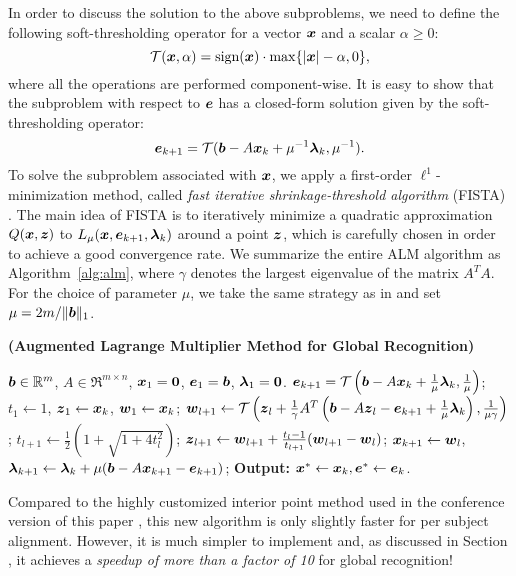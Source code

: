 In order to discuss the solution to the above subproblems, we
need to define the following soft-thresholding operator for a
vector ${\boldsymbol{x}}$ and a scalar $\alpha \geq 0$:
\begin{equation}
\mathcal{T}({\boldsymbol{x}},\alpha) = \textup{sign}({\boldsymbol{x}})\cdot \max \{|{\boldsymbol{x}}| - \alpha, 0\},
\end{equation}
where all the operations are performed component-wise. It is
easy to show that the subproblem with respect to $\boldsymbol{e}$ has a
closed-form solution given by the soft-thresholding operator:
\begin{equation}
\boldsymbol{e}_{k+1} = \mathcal{T}(\boldsymbol{b} - A{\boldsymbol{x}}_k + \mu^{-1}\boldsymbol{\lambda}_k, \mu^{-1}).
\end{equation}
To solve the subproblem associated with ${\boldsymbol{x}}$, we
apply a first-order $\ell^1$-minimization method,
called \emph{fast iterative shrinkage-threshold algorithm}
(FISTA) \cite{BeckA2009}. The main idea of FISTA is to
iteratively minimize a quadratic approximation $Q({\boldsymbol{x}}, \boldsymbol{z})$ to
$L_{\mu} ({\boldsymbol{x}},\boldsymbol{e}_{k+1},\boldsymbol{\lambda}_k)$ around a point $\boldsymbol{z}$, which is
carefully chosen in order to achieve a good convergence
rate. We summarize the entire ALM
algorithm as Algorithm~\ref{alg:alm}, where $\gamma$ denotes the
largest eigenvalue of the matrix $A^TA$. For the choice of parameter $\mu$, we take the same strategy as
in \cite{YangJ2009-pp} and set $\mu = 2m / \|\boldsymbol{b}\|_1$.
\begin{algorithm}[t]
\caption{\bf (Augmented Lagrange Multiplier Method for Global
Recognition)}
\begin{algorithmic}[1]
\begin{small}
 $\boldsymbol{b} \in \mathbb R^m$, $A \in \Re^{m \times n}$,
${\boldsymbol{x}}_1 = \boldsymbol{0}$, $\boldsymbol{e}_1 = \boldsymbol{b}$, $\boldsymbol{\lambda}_1 =
\boldsymbol{0}$.
\STATE $\boldsymbol{e}_{k+1} = \mathcal{T}\left(\boldsymbol{b} - A{\boldsymbol{x}}_k +
\frac{1}{\mu}\boldsymbol{\lambda}_k, \frac{1}{\mu}\right)$;
\STATE $t_1\leftarrow 1$, $\boldsymbol{z}_1 \leftarrow {\boldsymbol{x}}_k$, $\boldsymbol{w}_1 \leftarrow {\boldsymbol{x}}_k$;
\STATE $\boldsymbol{w}_{l+1} \leftarrow \mathcal{T}\left(\boldsymbol{z}_l +
\frac{1}{\gamma}A^T\left(\boldsymbol{b} - A\boldsymbol{z}_l - \boldsymbol{e}_{k+1} +
\frac{1}{\mu}\boldsymbol{\lambda}_k\right), \frac{1}{\mu\gamma}\right)$;
\STATE $t_{l+1} \leftarrow \frac{1}{2}\left( 1 +
\sqrt{1+4t_l^2}\right)$;
\STATE $\boldsymbol{z}_{l+1} \leftarrow \boldsymbol{w}_{l+1} + \frac{t_l - 1}{t_{l+1}}(\boldsymbol{w}_{l+1} - \boldsymbol{w}_l)$;
\ENDWHILE
\STATE ${\boldsymbol{x}}_{k+1} \leftarrow \boldsymbol{w}_{l}$,  \; $\boldsymbol{\lambda}_{k+1} \leftarrow \boldsymbol{\lambda}_k + \mu (\boldsymbol{b} - A{\boldsymbol{x}}_{k+1} - \boldsymbol{e}_{k+1})$;
\ENDWHILE \STATE
{\bf Output:} ${\boldsymbol{x}}^* \leftarrow {\boldsymbol{x}}_k, \boldsymbol{e}^* \leftarrow \boldsymbol{e}_k$.
\end{small}
\end{algorithmic}
\label{alg:alm}
\end{algorithm}

Compared to the highly customized interior point method used in the conference
version of this paper \cite{Wagner2009-CVPR}, this new algorithm is only
slightly faster for per subject alignment. However, it is much simpler to
implement and, as discussed in Section \label{sec:pipeline_implementation}, it
achieves a \emph{speedup of more than a factor of 10} for global recognition!
